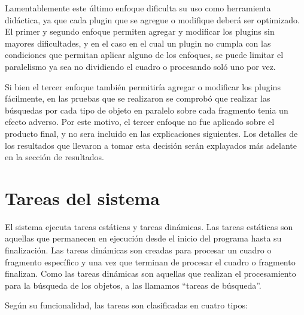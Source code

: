 Lamentablemente este último enfoque dificulta su uso como herramienta didáctica,
ya que cada plugin que se agregue o modifique deberá ser optimizado. El primer y
segundo enfoque permiten agregar y modificar los plugins sin mayores
dificultades, y en el caso en el cual un plugin no cumpla con las condiciones
que permitan aplicar alguno de los enfoques, se puede limitar el paralelismo ya
sea no dividiendo el cuadro o procesando soló uno por vez.

Si bien el tercer enfoque también permitiría agregar o modificar los plugins
fácilmente, en las pruebas que se realizaron se comprobó que realizar las
búsquedas por cada tipo de objeto en paralelo sobre cada fragmento tenia un
efecto adverso. Por este motivo, el tercer enfoque no fue aplicado sobre el
producto final, y no sera incluido en las explicaciones siguientes. Los detalles
de los resultados que llevaron a tomar esta decisión serán explayados más
adelante en la sección de resultados.

\section{Tareas del sistema}

El sistema ejecuta tareas estáticas y tareas dinámicas. Las tareas estáticas son
aquellas que permanecen en ejecución desde el inicio del programa hasta su
finalización. Las tareas dinámicas son creadas para procesar un cuadro o
fragmento específico y una vez que terminan de procesar el cuadro o fragmento
finalizan. Como las tareas dinámicas son aquellas que realizan el procesamiento
para la búsqueda de los objetos, a las llamamos ``tareas de búsqueda''.

Según su funcionalidad, las tareas son clasificadas en cuatro tipos:

